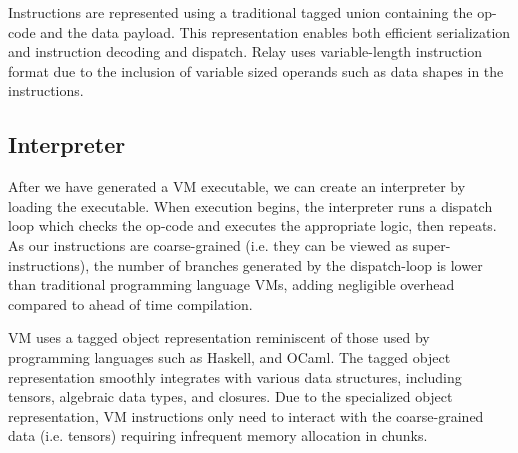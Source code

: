 Instructions are represented using a traditional tagged union containing the op-code and the data payload. This representation enables both efficient serialization and instruction decoding and dispatch. Relay uses variable-length instruction format due to the inclusion of variable sized operands such as data shapes in the instructions.


\subsection{Interpreter}

After we have generated a VM executable,
we can create an interpreter by loading the executable. When execution begins, the interpreter runs a dispatch loop which checks the op-code and executes the appropriate logic, then repeats. As our instructions are coarse-grained (i.e. they can be viewed as super-instructions), the number of branches generated by the dispatch-loop is lower than traditional programming language VMs, adding negligible overhead compared to ahead of time compilation.

VM uses a tagged object representation reminiscent of those used by programming languages such as Haskell, and OCaml. The tagged object representation smoothly integrates with various data structures, including tensors, algebraic data types, and closures. Due to the specialized object representation, VM instructions only need to interact with the coarse-grained data (i.e. tensors) requiring infrequent memory allocation in chunks.

